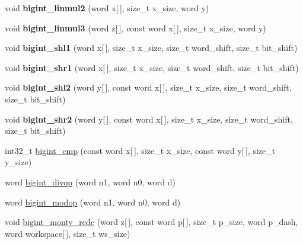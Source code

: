 \begin{DoxyCompactItemize}
void {\bfseries bigint\+\_\+linmul2} (word x\mbox{[}$\,$\mbox{]}, size\+\_\+t x\+\_\+size, word y)
\item 
\mbox{\label{namespace_botan_a13a0dbb64f0550a99fa972cb7400be41}} 
void {\bfseries bigint\+\_\+linmul3} (word z\mbox{[}$\,$\mbox{]}, const word x\mbox{[}$\,$\mbox{]}, size\+\_\+t x\+\_\+size, word y)
\item 
\mbox{\label{namespace_botan_a24872afc46265755e52a59856c98454d}} 
void {\bfseries bigint\+\_\+shl1} (word x\mbox{[}$\,$\mbox{]}, size\+\_\+t x\+\_\+size, size\+\_\+t word\+\_\+shift, size\+\_\+t bit\+\_\+shift)
\item 
\mbox{\label{namespace_botan_a11b30e71e7edbaffbf2cc2064a523c3e}} 
void {\bfseries bigint\+\_\+shr1} (word x\mbox{[}$\,$\mbox{]}, size\+\_\+t x\+\_\+size, size\+\_\+t word\+\_\+shift, size\+\_\+t bit\+\_\+shift)
\item 
\mbox{\label{namespace_botan_a7dbf6925cd8001d366fd3fb5f50ddc7e}} 
void {\bfseries bigint\+\_\+shl2} (word y\mbox{[}$\,$\mbox{]}, const word x\mbox{[}$\,$\mbox{]}, size\+\_\+t x\+\_\+size, size\+\_\+t word\+\_\+shift, size\+\_\+t bit\+\_\+shift)
\item 
\mbox{\label{namespace_botan_ac391d5980517de118fb57b798ab9e48a}} 
void {\bfseries bigint\+\_\+shr2} (word y\mbox{[}$\,$\mbox{]}, const word x\mbox{[}$\,$\mbox{]}, size\+\_\+t x\+\_\+size, size\+\_\+t word\+\_\+shift, size\+\_\+t bit\+\_\+shift)
\item 
int32\+\_\+t \mbox{\hyperlink{namespace_botan_ada2360db2beff295a13a8e3a96136a61}{bigint\+\_\+cmp}} (const word x\mbox{[}$\,$\mbox{]}, size\+\_\+t x\+\_\+size, const word y\mbox{[}$\,$\mbox{]}, size\+\_\+t y\+\_\+size)
\item 
word \mbox{\hyperlink{namespace_botan_a02cea0cc0c767a608413ba0cac4e74c4}{bigint\+\_\+divop}} (word n1, word n0, word d)
\item 
word \mbox{\hyperlink{namespace_botan_acffd94b3a9b524da12c07a88fdda1eb7}{bigint\+\_\+modop}} (word n1, word n0, word d)
\item 
void \mbox{\hyperlink{namespace_botan_aafff2116e1ca1980d42a3efdf85c9287}{bigint\+\_\+monty\+\_\+redc}} (word z\mbox{[}$\,$\mbox{]}, const word p\mbox{[}$\,$\mbox{]}, size\+\_\+t p\+\_\+size, word p\+\_\+dash, word workspace\mbox{[}$\,$\mbox{]}, size\+\_\+t ws\+\_\+size)

\end{DoxyCompactItemize}

